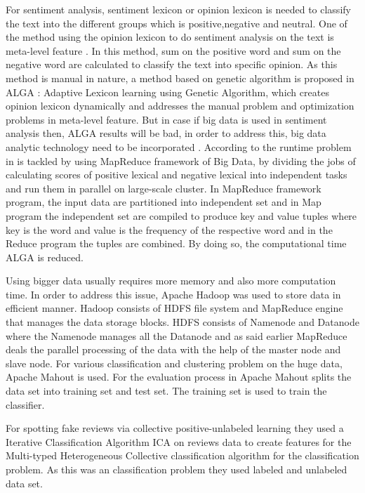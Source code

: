 \documentclass[sigconf]{acmart}
\begin{document}
For sentiment analysis, sentiment lexicon or opinion lexicon is needed to classify the text into the different groups which is positive,negative and neutral. One of the method using the opinion lexicon to do sentiment analysis on the text is meta-level feature \cite{BRAVOMARQUEZ201486}. In this method, sum on the positive word and sum on the negative word are calculated to classify the text into specific opinion. As this method is manual in nature, a method based on genetic algorithm is proposed in \cite{KESHAVARZ20171} ALGA : Adaptive Lexicon learning using Genetic Algorithm, which creates opinion lexicon dynamically and addresses the manual problem and optimization problems in meta-level feature. But in case if big data is used in sentiment analysis then, ALGA results will be bad, in order to address this, big data analytic technology need to be incorporated \cite{bigdatainsenti}. According to \cite{bigdatainsenti} the runtime problem in \cite{KESHAVARZ20171} is tackled by using MapReduce framework of Big Data, by dividing the jobs of calculating scores of positive lexical and negative lexical into independent tasks and run them in parallel on large-scale cluster. In MapReduce framework program, the input data are partitioned into independent set and in Map program the independent set are compiled to produce key and value tuples where key is the word and value is the frequency of the respective word and in the Reduce program the tuples are combined. By doing so, the computational time ALGA \cite{KESHAVARZ20171} is reduced. 

Using bigger data usually requires more memory and also more computation time. In order to address this issue, Apache Hadoop \cite{hadoopsenti} was used to store data in efficient manner. Hadoop consists of HDFS file system and MapReduce engine that manages the data storage blocks. HDFS consists of Namenode and Datanode \cite{hadoopsenti} where the Namenode manages all the Datanode and as said earlier MapReduce deals the parallel processing of the data with the help of the master node and slave node. For various classification and clustering problem on the huge data, Apache Mahout \cite{hadoopsenti} is used. For the evaluation process in \cite{hadoopsenti} Apache Mahout splits the data set into training set and test set. The training set is used to train the classifier.

For spotting fake reviews via collective positive-unlabeled learning \cite{http://ieeexplore.ieee.org.proxyiub.uits.iu.edu/stamp/stamp.jsp?tp=&arnumber=7023420} they used a Iterative Classification Algorithm ICA \cite{same} on reviews data to create features for the Multi-typed Heterogeneous Collective classification algorithm for the classification problem. As this was an classification problem they used labeled and unlabeled data set.
\end{document}
